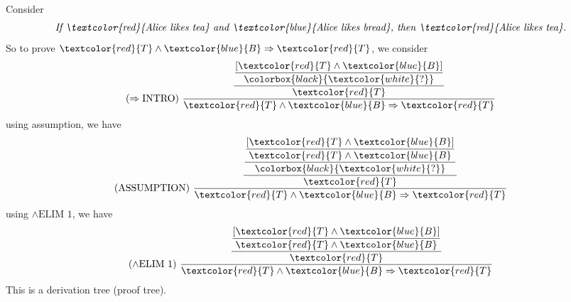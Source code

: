 \begin{eg}
Consider
\[
  \textit{If \textcolor{red}{Alice likes tea} and \textcolor{blue}{Alice likes bread}, then \textcolor{red}{Alice likes tea}.} 
\]
So to prove \(\textcolor{red}{T} \wedge \textcolor{blue}{B} \Rightarrow \textcolor{red}{T}\), we consider
\[
  (\Rightarrow \text{INTRO})\ \dfrac{\dfrac{\dfrac{[\textcolor{red}{T} \wedge \textcolor{blue}{B}]}{\colorbox{black}{\textcolor{white}{?}}}}{\textcolor{red}{T}}}{\textcolor{red}{T} \wedge \textcolor{blue}{B} \Rightarrow \textcolor{red}{T}}
\]
using assumption, we have
\[
  (\text{ASSUMPTION})\ \dfrac{\dfrac{\dfrac{\dfrac{[\textcolor{red}{T} \wedge \textcolor{blue}{B}]}{\textcolor{red}{T} \wedge \textcolor{blue}{B}}}{\colorbox{black}{\textcolor{white}{?}}}}{\textcolor{red}{T}}}{\textcolor{red}{T} \wedge \textcolor{blue}{B} \Rightarrow \textcolor{red}{T}}
\]
using \(\wedge \text{ELIM 1}\), we have
\[
  (\wedge \text{ELIM 1})\ \dfrac{\dfrac{\dfrac{[\textcolor{red}{T} \wedge \textcolor{blue}{B}]}{\textcolor{red}{T} \wedge \textcolor{blue}{B}}}{\textcolor{red}{T}}}{\textcolor{red}{T} \wedge \textcolor{blue}{B} \Rightarrow \textcolor{red}{T}}
\]
This is a derivation tree (proof tree).
\end{eg}

